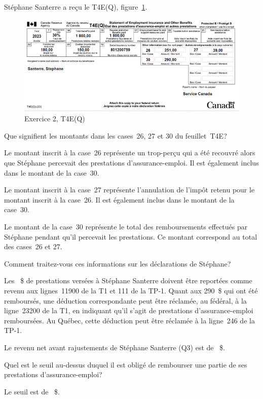 \begin{question}
	Stéphane Santerre a reçu le T4E(Q), figure~\ref{fig:chap7Exercice2T4EQ}.
	\begin{figure}
		\centering
		\includegraphics[width=.9\textwidth]{exercice/7-2/Q3/T4EQ.png}
		\caption[]{Exercice 2, T4E(Q)}
		\label{fig:chap7Exercice2T4EQ}
	\end{figure}
\end{question}
\setcounter{sousQuestion}{0}
\begin{sousQuestion}
	Que signifient les montants dans les cases~26, 27 et 30 du feuillet~T4E?
\end{sousQuestion}
Le montant inscrit à la case~26 représente un trop-perçu qui a été recouvré alors que Stéphane percevait des prestations d'assurance-emploi. Il est également inclus dans le montant de la case~30.

Le montant inscrit à la case~27 représente l'annulation de l'impôt retenu pour le montant inscrit à la case~26. Il est également inclus dans le montant de la case~30.

Le montant de la case~30 représente le total des remboursements effectués par Stéphane pendant qu'il percevait les prestations. Ce montant correspond au total des cases~26 et 27.

\begin{sousQuestion}
	Comment traitez-vous ces informations sur les déclarations de Stéphane?
\end{sousQuestion}
Les ~\$ de prestations versées à Stéphane Santerre doivent être reportées comme revenu aux lignes~11900 de la T1 et 111 de la TP-1. Quant aux 290~\$ qui ont été remboursés, une déduction correspondante peut être réclamée, au fédéral, à la ligne~23200 de la T1, en indiquant qu'il s'agit de prestations d'assurance-emploi remboursées. Au Québec, cette déduction peut être réclamée à la ligne~246 de la TP-1.

\begin{question}
	Le revenu net avant rajustements de Stéphane Santerre (Q3) est de ~\$.
\end{question}
\setcounter{sousQuestion}{0}
\begin{sousQuestion}
	Quel est le seuil au-dessus duquel il est obligé de rembourser une partie de ses prestations d'assurance-emploi?
\end{sousQuestion}
Le seuil est de ~\$.

